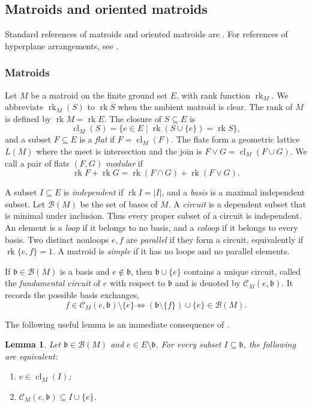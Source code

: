 \documentclass[10pt]{amsart}
\theoremstyle{plain}
\newtheorem{lemma}[theorem]{Lemma}
\theoremstyle{definition}
\newcommand{\B}{\mathcal{B}}
\newcommand{\C}{\mathcal{C}}
\newcommand{\rk}{\operatorname{rk}}
\newcommand{\cl}{\operatorname{cl}}
\newcommand{\bb}{\mathfrak{b}}
\begin{document}
\subsection{Matroids and oriented matroids}\label{matroid-background}
Standard references of matroids and oriented matroids are \cite{Oxley2011,Bjorner1999,Anderson2025}. For references of hyperplane arrangements, see \cite{Stanley2007,Orlik1992}.

\subsubsection{Matroids}
Let $M$ be a matroid on the finite ground set $E$, with rank function $\rk_M$. We abbreviate $\rk_M(S)$ to $\rk S$ when the ambient matroid is clear. The rank of $M$ is defined by $\rk M=\rk E$. The closure of $S\subseteq E$ is
\[
\cl_M(S)=\{e\in E \mid \rk(S\cup\{e\})=\rk S\},
\]
and a subset $F\subseteq E$ is a \emph{flat} if $F=\cl_M(F)$. The flats form a geometric lattice $L(M)$ where the meet is intersection and the join is $F\vee G=\cl_M(F\cup G)$. We call a pair of flats $(F,G)$ \emph{modular} if
\[
\rk F+\rk G=\rk(F\cap G)+\rk(F\vee G).
\]

A subset $I\subseteq E$ is \emph{independent} if $\rk I=|I|$, and a \emph{basis} is a maximal independent subset. Let $\B(M)$ be the set of bases of $M$. A \emph{circuit} is a dependent subset that is minimal under inclusion. Thus every proper subset of a circuit is independent. An element is a \emph{loop} if it belongs to no basis, and a \emph{coloop} if it belongs to every basis. Two distinct nonloops $e,f$ are \emph{parallel} if they form a circuit, equivalently if $\rk\{e,f\}=1$. A matroid is \emph{simple} if it has no loops and no parallel elements.

If $\bb\in\B(M)$ is a basis and $e\not\in\bb$, then $\bb\cup\{e\}$ contains a unique circuit, called the \emph{fundamental circuit} of $e$ with respect to $\bb$ and is denoted by $\C_M(e,\bb)$. It records the possible basis exchanges,
\[
f\in \C_M(e,\bb)\setminus\{e\}\iff(\bb\setminus\{f\})\cup\{e\}\in\B(M).
\]

The following useful lemma is an immediate consequence of \cite[Proposition~1.1.6, Corollary~1.2.6, and Proposition~1.4.11]{Oxley2011}.

\begin{lemma}\label{fund-circuit-lemma}
Let $\bb\in\B(M)$ and $e\in E\setminus\bb$. For every subset $I\subseteq\bb$, the following are equivalent:
\begin{enumerate}[label=\textup{(\roman*)}]
\item $e\in\cl_M(I)$;
\item $\mathcal C_M(e,\bb)\subseteq I\cup\{e\}$.
\end{enumerate}
\end{lemma}
\end{document}
